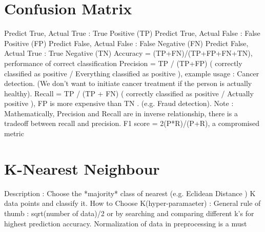 \documentclass{article}
\begin{document}
\section{Confusion Matrix}
Predict True, Actual True : True Positive (TP) \newline
Predict True, Actual False : False Positive (FP) \newline
Predict False, Actual False : False Negative (FN)\newline 
Predict False, Actual True : True Negative (TN)\newline
\newline
\newline
Accuracy = (TP+FN)/(TP+FP+FN+TN), performance of correct classification
\newline
\newline
Precision = TP / (TP+FP)  ( correctly classified as positive / Everything classified as positive ), example usage : Cancer detection. (We don't want to initiate cancer treatment if the person is actually healthy).  
\newline
\newline
Recall = TP / (TP + FN) ( correctly classified as positive / Actually positive ), FP is more expensive than TN . (e.g. Fraud detection).
\newline
\newline
Note : Mathematically, Precision and Recall are in inverse relationship, there is a tradeoff between recall and precision.
\newline
\newline
F1 score = 2(P*R)/(P+R), a compromised metric


\section{K-Nearest Neighbour}
Description : Choose the *majority* class of nearest (e.g. Eclidean Distance ) K data points and classify it.  
\newline
How to Choose K(hyper-paramaeter) : General rule of thumb : sqrt(number of data)/2 or by searching and comparing different k's for highest prediction accuracy.
\newline 
Normalization of data in preprocessing is a must
\end{document}

